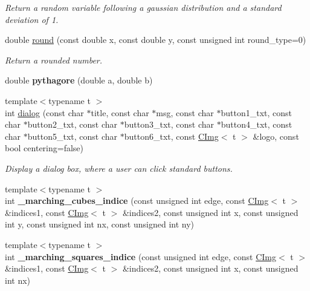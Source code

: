 \begin{DoxyCompactItemize}
\begin{DoxyCompactList}\small\item\em Return a random variable following a gaussian distribution and a standard deviation of 1. \end{DoxyCompactList}\item 
\hypertarget{namespacecimg__library_1_1cimg_aea674560ff8416d8f1753271865f3d65}{double \hyperlink{namespacecimg__library_1_1cimg_aea674560ff8416d8f1753271865f3d65}{round} (const double x, const double y, const unsigned int round\-\_\-type=0)}\label{namespacecimg__library_1_1cimg_aea674560ff8416d8f1753271865f3d65}

\begin{DoxyCompactList}\small\item\em Return a rounded number. \end{DoxyCompactList}\item 
\hypertarget{namespacecimg__library_1_1cimg_ac6f5f59fdedf59faef8111b822cb567f}{double {\bfseries pythagore} (double a, double b)}\label{namespacecimg__library_1_1cimg_ac6f5f59fdedf59faef8111b822cb567f}

\item 
{\footnotesize template$<$typename t $>$ }\\int \hyperlink{namespacecimg__library_1_1cimg_a62805bf0845c650a457cd78b3cd6488a}{dialog} (const char $\ast$title, const char $\ast$msg, const char $\ast$button1\-\_\-txt, const char $\ast$button2\-\_\-txt, const char $\ast$button3\-\_\-txt, const char $\ast$button4\-\_\-txt, const char $\ast$button5\-\_\-txt, const char $\ast$button6\-\_\-txt, const \hyperlink{structcimg__library_1_1_c_img}{C\-Img}$<$ t $>$ \&logo, const bool centering=false)
\begin{DoxyCompactList}\small\item\em Display a dialog box, where a user can click standard buttons. \end{DoxyCompactList}\item 
\hypertarget{namespacecimg__library_1_1cimg_ae2e49a2d44560e473b08fd016987c2ac}{{\footnotesize template$<$typename t $>$ }\\int {\bfseries \-\_\-marching\-\_\-cubes\-\_\-indice} (const unsigned int edge, const \hyperlink{structcimg__library_1_1_c_img}{C\-Img}$<$ t $>$ \&indices1, const \hyperlink{structcimg__library_1_1_c_img}{C\-Img}$<$ t $>$ \&indices2, const unsigned int x, const unsigned int y, const unsigned int nx, const unsigned int ny)}\label{namespacecimg__library_1_1cimg_ae2e49a2d44560e473b08fd016987c2ac}

\item 
\hypertarget{namespacecimg__library_1_1cimg_af882d355122ca68e365592d34c9688b5}{{\footnotesize template$<$typename t $>$ }\\int {\bfseries \-\_\-marching\-\_\-squares\-\_\-indice} (const unsigned int edge, const \hyperlink{structcimg__library_1_1_c_img}{C\-Img}$<$ t $>$ \&indices1, const \hyperlink{structcimg__library_1_1_c_img}{C\-Img}$<$ t $>$ \&indices2, const unsigned int x, const unsigned int nx)}\label{namespacecimg__library_1_1cimg_af882d355122ca68e365592d34c9688b5}

\end{DoxyCompactItemize}
